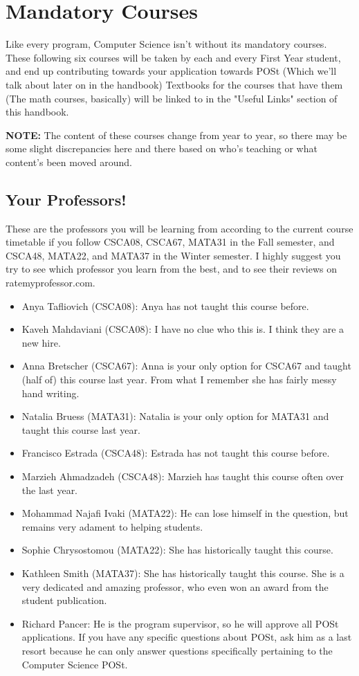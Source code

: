 \documentclass[11pt]{article}
\begin{document}
\section{Mandatory Courses}
Like every program, Computer Science isn't without its mandatory courses.  These following six courses will be taken by each and every First Year student, and end up contributing towards your application towards POSt (Which we'll talk about later on in the handbook) Textbooks for the courses that have them (The math courses, basically) will be linked to in the "Useful Links" section of this handbook.\par  \textbf{NOTE:} The content of these courses change from year to year, so there may be some slight discrepancies here and there based on who's teaching or what content's been moved around.

\subsection{Your Professors!}
These are the professors you will be learning from according to the current course timetable if you follow CSCA08, CSCA67, MATA31 in the Fall semester, and CSCA48, MATA22, and MATA37 in the Winter semester. I highly suggest you try to see which professor you learn from the best, and to see their reviews on ratemyprofessor.com.
\begin{itemize}
    \item Anya Tafliovich (CSCA08): Anya has not taught this course before.
    \item Kaveh Mahdaviani (CSCA08): I have no clue who this is. I think they are a new hire.
    \item Anna Bretscher (CSCA67): Anna is your only option for CSCA67 and taught (half of) this course last year. From what I remember she has fairly messy hand writing.
    \item Natalia Bruess (MATA31): Natalia is your only option for MATA31 and taught this course last year. 
    \item Francisco Estrada (CSCA48): Estrada has not taught this course before.
    \item Marzieh Ahmadzadeh (CSCA48): Marzieh has taught this course often over the last year.
    \item Mohammad Najafi Ivaki (MATA22): He can lose himself in the question, but remains very adament to helping students.
    \item Sophie Chrysostomou (MATA22): She has historically taught this course.
    \item Kathleen Smith (MATA37): She has historically taught this course. She is a very dedicated and amazing professor, who even won an award from the student publication.
    \item Richard Pancer: He is the program supervisor, so he will approve all POSt applications. If you have any specific questions about POSt, ask him as a last resort because he can only answer questions specifically pertaining to the Computer Science POSt.
\end{itemize}
\end{document}
